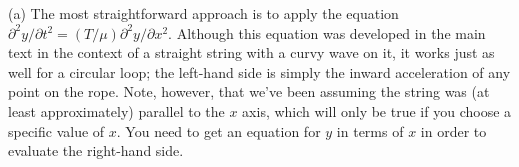 (a) The most straightforward approach is to apply the
equation $\partial^2y/\partial t^2=(T/\mu)\partial^2y/\partial x^2$.
Although this equation was developed in the main text in the
context of a straight string with a curvy wave on it, it works just
as well for a circular loop; the left-hand side is simply the inward
acceleration of any point on the rope. Note, however, that we've been
assuming the string was (at least approximately) parallel to the $x$ axis,
which will only be true if you choose a specific value of $x$.
You need to get an equation for
$y$ in terms of $x$ in order to evaluate the right-hand side.
